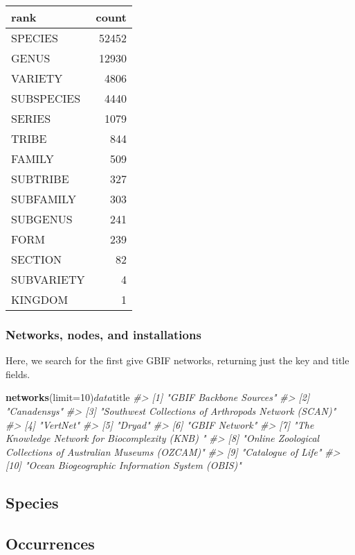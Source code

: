 \documentclass[author-year, review, 11pt]{components/elsarticle} %
\newenvironment{Shaded}{\begin{snugshade}}{\end{snugshade}}
\newcommand{\KeywordTok}[1]{\textcolor[rgb]{0.13,0.29,0.53}{\textbf{{#1}}}}
\newcommand{\DataTypeTok}[1]{\textcolor[rgb]{0.13,0.29,0.53}{{#1}}}
\newcommand{\DecValTok}[1]{\textcolor[rgb]{0.00,0.00,0.81}{{#1}}}
\newcommand{\CommentTok}[1]{\textcolor[rgb]{0.56,0.35,0.01}{\textit{{#1}}}}
\newcommand{\NormalTok}[1]{{#1}}
\begin{document}
\begin{longtable}[c]{@{}lr@{}}
\toprule
rank & count\tabularnewline
\midrule
\endhead
SPECIES & 52452\tabularnewline
GENUS & 12930\tabularnewline
VARIETY & 4806\tabularnewline
SUBSPECIES & 4440\tabularnewline
SERIES & 1079\tabularnewline
TRIBE & 844\tabularnewline
FAMILY & 509\tabularnewline
SUBTRIBE & 327\tabularnewline
SUBFAMILY & 303\tabularnewline
SUBGENUS & 241\tabularnewline
FORM & 239\tabularnewline
SECTION & 82\tabularnewline
SUBVARIETY & 4\tabularnewline
KINGDOM & 1\tabularnewline
\bottomrule
\end{longtable}

\subsubsection{Networks, nodes, and
installations}\label{networks-nodes-and-installations}

Here, we search for the first give GBIF networks, returning just the key
and title fields.

\begin{Shaded}
\begin{Highlighting}[]
\KeywordTok{networks}\NormalTok{(}\DataTypeTok{limit=}\DecValTok{10}\NormalTok{)$data$title}
\CommentTok{#>  [1] "GBIF Backbone Sources"                                      }
\CommentTok{#>  [2] "Canadensys"                                                 }
\CommentTok{#>  [3] "Southwest Collections of Arthropods Network (SCAN)"         }
\CommentTok{#>  [4] "VertNet"                                                    }
\CommentTok{#>  [5] "Dryad"                                                      }
\CommentTok{#>  [6] "GBIF Network"                                               }
\CommentTok{#>  [7] "The Knowledge Network for Biocomplexity (KNB) "             }
\CommentTok{#>  [8] "Online Zoological Collections of Australian Museums (OZCAM)"}
\CommentTok{#>  [9] "Catalogue of Life"                                          }
\CommentTok{#> [10] "Ocean Biogeographic Information System (OBIS)"}
\end{Highlighting}
\end{Shaded}

\subsection{Species}\label{species}

\subsection{Occurrences}\label{occurrences}
\end{document}
